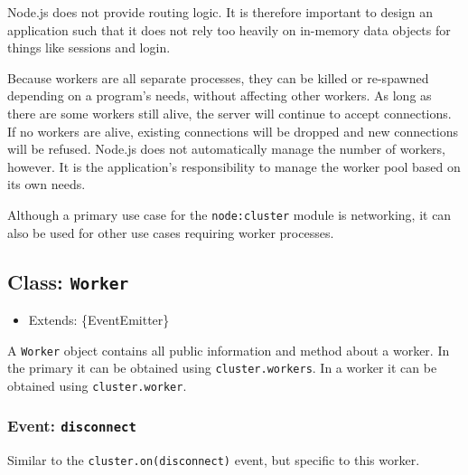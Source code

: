 Node.js does not provide routing logic. It is therefore important to
design an application such that it does not rely too heavily on
in-memory data objects for things like sessions and login.

Because workers are all separate processes, they can be killed or
re-spawned depending on a program's needs, without affecting other
workers. As long as there are some workers still alive, the server will
continue to accept connections. If no workers are alive, existing
connections will be dropped and new connections will be refused. Node.js
does not automatically manage the number of workers, however. It is the
application's responsibility to manage the worker pool based on its own
needs.

Although a primary use case for the \texttt{node:cluster} module is
networking, it can also be used for other use cases requiring worker
processes.

\subsection{\texorpdfstring{Class:
\texttt{Worker}}{Class: Worker}}\label{class-worker}

\begin{itemize}
\tightlist
\item
  Extends: \{EventEmitter\}
\end{itemize}

A \texttt{Worker} object contains all public information and method
about a worker. In the primary it can be obtained using
\texttt{cluster.workers}. In a worker it can be obtained using
\texttt{cluster.worker}.

\subsubsection{\texorpdfstring{Event:
\texttt{\textquotesingle{}disconnect\textquotesingle{}}}{Event: \textquotesingle disconnect\textquotesingle{}}}\label{event-disconnect}

Similar to the
\texttt{cluster.on(\textquotesingle{}disconnect\textquotesingle{})}
event, but specific to this worker.

\begin{Shaded}
\begin{Highlighting}[]
\NormalTok{()}\NormalTok{(}\OperatorTok{,}\NormalTok{ () }\KeywordTok{=\textgreater{}}\NormalTok{ \{}
\NormalTok{\})}\OperatorTok{;}
\end{Highlighting}
\end{Shaded}

